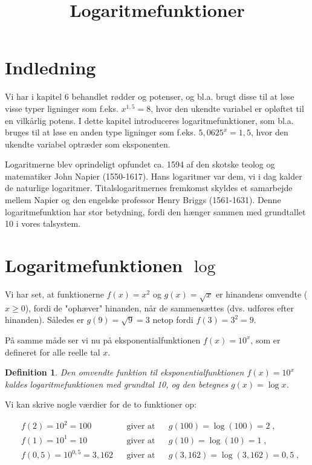\documentclass[12pt,oneside,a4paper]{article}
\title{Logaritmefunktioner}
\date{\vspace{-5ex}}
\theoremstyle{plain}
\newtheorem*{mydef}{Definition}
\begin{document}
\maketitle

\section*{Indledning}
Vi har i kapitel 6 behandlet rødder og potenser, og bl.a. brugt disse
til at løse visse typer ligninger som f.eks. $x^{1,5} = 8$, hvor den ukendte
variabel er opløftet til en vilkårlig potens.
I dette kapitel introduceres logaritmefunktioner, som bl.a. bruges
til at løse en anden type ligninger som f.eks. $5,0625^x = 1,5$, hvor den ukendte
variabel optræder som eksponenten.

Logaritmerne blev oprindeligt opfundet ca. 1594 af den skotske teolog og matematiker John
Napier (1550-1617). Hans logaritmer var dem, vi i dag kalder de naturlige
logaritmer. Titalslogaritmernes fremkomst skyldes et samarbejde mellem Napier
og den engelske professor Henry Briggs (1561-1631). Denne logaritmefunktion har
stor betydning, fordi den hænger sammen med grundtallet 10 i vores talsystem.

\section*{Logaritmefunktionen $\log$}
Vi har set, at funktionerne $f(x) = x^2$ og $g(x) = \sqrt{x}$  er hinandens omvendte
($x \geq 0$), fordi de "ophæver" hinanden, når de sammensættes (dvs. udføres
efter hinanden).  Således er $g(9) = \sqrt{9} = 3$ netop fordi $f(3) = 3^2 = 9$.

På samme måde ser vi nu på eksponentialfunktionen $f(x) = 10^x$, som er
defineret for alle reelle tal $x$.

\begin{mydef}
Den omvendte funktion til eksponentialfunktionen $f(x) = 10^x$ kaldes {\em
logaritmefunktionen med grundtal 10}, og den betegnes $g(x) = \log x$.
\end{mydef}

Vi kan skrive nogle værdier for de to funktioner op:

\[
\begin{aligned}
    &f(2) = 10^2 = 100 && \text{giver at} && g(100) = \log (100) = 2 \; , \\
    &f(1) = 10^1 = 10 && \text{giver at} && g(10) = \log (10) = 1 \; , \\
    &f(0,5) = 10^{0,5} = 3,162 && \text{giver at} && g(3,162) = \log (3,162) = 0,5 \; ,
\end{aligned}
\]
\end{document}
